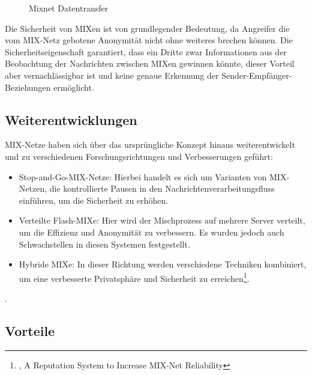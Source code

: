 \begin{figure}[h!]
    \centering
    
    \caption{Mixnet Datentransfer}
    \label{imgs:mixnet_transfer}
\end{figure}

Die Sicherheit von MIXen ist von grundlegender Bedeutung, da Angreifer die vom MIX-Netz gebotene Anonymität nicht ohne weiteres brechen können. Die Sicherheitseigenschaft garantiert, dass ein Dritte zwar Informationen aus der Beobachtung der Nachrichten zwischen MIXen gewinnen könnte, dieser Vorteil aber vernachlässigbar ist und keine genaue Erkennung der Sender-Empfänger-Beziehungen ermöglicht.

\subsection{Weiterentwicklungen}
\label{chap:mixnet_enhancements}

MIX-Netze haben sich über das ursprüngliche Konzept hinaus weiterentwickelt und zu verschiedenen Forschungsrichtungen und Verbesserungen geführt:

\begin{itemize}
    \item Stop-and-Go-MIX-Netze: Hierbei handelt es sich um Varianten von MIX-Netzen, die kontrollierte Pausen in den Nachrichtenverarbeitungsfluss einführen, um die Sicherheit zu erhöhen.
    \item Verteilte \glqq Flash-MIXe\grqq: Hier wird der Mischprozess auf mehrere Server verteilt, um die Effizienz und Anonymität zu verbessern. Es wurden jedoch auch Schwachstellen in diesen Systemen festgestellt.
    \item Hybride MIXe: In dieser Richtung werden verschiedene Techniken kombiniert, um eine verbesserte Privatsphäre und Sicherheit zu erreichen\footnote{\cite{MIXNetReliability}, A Reputation System to Increase MIX-Net Reliability}.
\end{itemize}.

\subsection{Vorteile}
\label{chap:mixnet_advantages}


